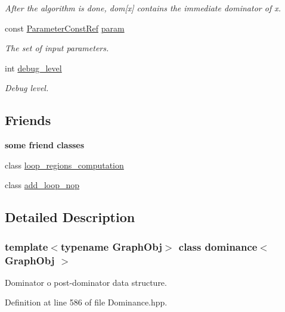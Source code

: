\begin{DoxyCompactItemize}
\begin{DoxyCompactList}\small\item\em After the algorithm is done, dom\mbox{[}x\mbox{]} contains the immediate dominator of x. \end{DoxyCompactList}\item 
const \hyperlink{Parameter_8hpp_a37841774a6fcb479b597fdf8955eb4ea}{Parameter\+Const\+Ref} \hyperlink{classdominance_add5c8ef2ac2e43d282fa5fbc552bfb5e}{param}
\begin{DoxyCompactList}\small\item\em The set of input parameters. \end{DoxyCompactList}\item 
int \hyperlink{classdominance_a5e618cd8f2f0f3a136b43d4e2b4c5516}{debug\+\_\+level}
\begin{DoxyCompactList}\small\item\em Debug level. \end{DoxyCompactList}\end{DoxyCompactItemize}
\subsection*{Friends}
\begin{Indent}\textbf{ some friend classes}\par
\begin{DoxyCompactItemize}
\item 
class \hyperlink{classdominance_adf3162ccf639fca2399b989864815b0c}{loop\+\_\+regions\+\_\+computation}
\item 
class \hyperlink{classdominance_aaa74bc08e8734cd3e20273fb6092781a}{add\+\_\+loop\+\_\+nop}
\end{DoxyCompactItemize}
\end{Indent}


\subsection{Detailed Description}
\subsubsection*{template$<$typename Graph\+Obj$>$\newline
class dominance$<$ Graph\+Obj $>$}

Dominator o post-\/dominator data structure. 

Definition at line 586 of file Dominance.\+hpp.



